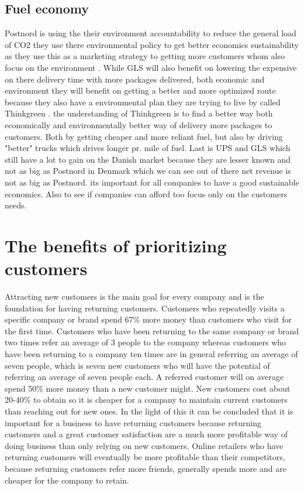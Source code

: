 \documentclass[12pt]{report}
\begin{document}
\subsection{Fuel economy}
Postnord is using the their environment accountability to reduce the general load of CO2 they use there environmental policy to get better economics sustainability as they use this as a marketing strategy to getting more customers whom also focus on the environment \cite{Postnordmiljoansvar}. 
While GLS will also benefit on lowering the expensive on there delivery time with more packages delivered, both economic and environment they will benefit on getting a better and more optimized route because they also have a environmental plan they are trying to live by called Thinkgreen \cite{ThinkGLS}. 
the understanding of Thinkgreen is to find a better way both economically and environmentally better way of delivery more packages to customers\cite{ThinkGLS}. 
Both by getting cheaper and more reliant fuel, but also by driving "better" trucks which drives longer pr. mile of fuel. 
Last is UPS and GLS which still have a lot to gain on the Danish market because they are lesser known and not as big as Postnord in Denmark which we can see out of there net revenue is not as big as Postnord\cite{Postnordregnskab, GLSregnskab, UPSregnskab}.
its important for all companies to have a good sustainable economics. 
Also to see if companies can afford too focus only on the customers needs.


\section{The benefits of prioritizing customers}
Attracting new customers is the main goal for every company and is the foundation for having returning customers. Customers who repeatedly visits a specific company or brand spend 67\% more money than customers who visit for the first time\cite{BainAndCompany}. Customers who have been returning to the same company or brand two times refer an average of 3 people to the company whereas customers who have been returning to a company ten times are in general referring an average of seven people\cite{BainAndCompany}, which is seven new customers who will have the potential of referring an average of seven people each. A referred customer will on average spend 50\% more money than a new customer might\cite{BainAndCompany}.
New customers cost about 20-40\% to obtain so it is cheaper for a company to maintain current customers than reaching out for new ones\cite{E-loyalty}.
In the light of this it can be concluded that it is important for a business to have returning customers because returning customers and a great customer satisfaction are a much more profitable way of doing business than only relying on new customers.
Online retailers who have returning customers will eventually be more profitable than their competitors, because returning customers refer more friends, generally spends more and are cheaper for the company to retain\cite{BainAndCompany}\cite{E-loyalty}.
\end{document}
